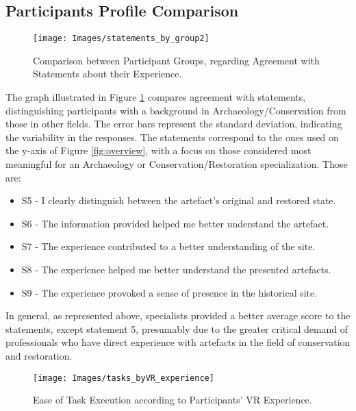 \subsection{Participants Profile Comparison}
\label{sec:comparison}

\begin{figure}[h!]
    \centering
    \texttt{[image: Images/statements\_by\_group2]}
    \caption{Comparison between Participant Groups, regarding Agreement with Statements about their Experience.} 
    \label{fig:statements_background}
\end{figure}

The graph illustrated in Figure \ref{fig:statements_background} compares agreement with statements, distinguishing participants with a background in Archaeology/Conservation from those in other fields. The error bars represent the standard deviation, indicating the variability in the responses.
The statements correspond to the ones used on the y-axis of Figure \ref{fig:overview}, with a focus on those considered most meaningful for an Archaeology or Conservation/Restoration specialization.
Those are: 

\begin{itemize}
  \item S5 - I clearly distinguish between the artefact's original and restored state.
  \item S6 - The information provided helped me better understand the artefact.
  \item S7 - The experience contributed to a better understanding of the site.
  \item S8 - The experience helped me better understand the presented artefacts.
  \item S9 - The experience provoked a sense of presence in the historical site.
\end{itemize}

In general, as represented above, specialists provided a better average score to the statements, except statement 5, presumably due to the greater critical demand of professionals who have direct experience with artefacts in the field of conservation and restoration.

\begin{figure}[h!]
     \centering
     \texttt{[image: Images/tasks\_byVR\_experience]}
     \caption{Ease of Task Execution according to Participants’ \gls{VR} Experience.} 
     \label{fig:tasks_byVR_experience}
 \end{figure}

